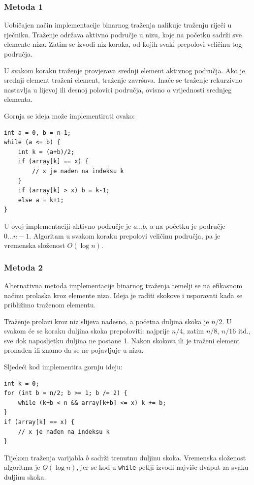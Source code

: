 \subsubsection{Metoda 1}

Uobičajen način implementacije binarnog traženja
nalikuje traženju riječi u rječniku.
Traženje održava aktivno područje u nizu,
koje na početku sadrži sve elemente niza.
Zatim se izvodi niz koraka,
od kojih svaki prepolovi veličinu tog područja.

U svakom koraku traženje provjerava srednji element
aktivnog područja.
Ako je srednji element traženi element,
traženje završava.
Inače se traženje rekurzivno nastavlja
u lijevoj ili desnoj polovici područja,
ovisno o vrijednosti srednjeg elementa.

Gornja se ideja može implementirati ovako:
\begin{lstlisting}
int a = 0, b = n-1;
while (a <= b) {
    int k = (a+b)/2;
    if (array[k] == x) {
        // x je nađen na indeksu k
    }
    if (array[k] > x) b = k-1;
    else a = k+1;
}
\end{lstlisting}

U ovoj implementaciji aktivno područje je $a \ldots b$,
a na početku je područje $0 \ldots n-1$.
Algoritam u svakom koraku prepolovi veličinu područja,
pa je vremenska složenost $O(\log n)$.

\subsubsection{Metoda 2}

Alternativna metoda implementacije binarnog traženja
temelji se na efikasnom načinu prolaska kroz
elemente niza.
Ideja je raditi skokove i usporavati
kada se približimo traženom elementu.

Traženje prolazi kroz niz slijeva
nadesno, a početna duljina skoka je $n/2$.
U svakom će se koraku duljina skoka prepoloviti:
najprije $n/4$, zatim $n/8$, $n/16$ itd., sve dok
naposljetku duljina ne postane 1.
Nakon skokova ili je traženi element
pronađen ili znamo da se ne pojavljuje u nizu.

Sljedeći kod implementira gornju ideju:
\begin{lstlisting}
int k = 0;
for (int b = n/2; b >= 1; b /= 2) {
    while (k+b < n && array[k+b] <= x) k += b;
}
if (array[k] == x) {
    // x je nađen na indeksu k
}
\end{lstlisting}

Tijekom traženja varijabla $b$
sadrži trenutnu duljinu skoka.
Vremenska složenost algoritma je $O(\log n)$,
jer se kod u \texttt{while} petlji
izvodi najviše dvaput za svaku duljinu skoka.

